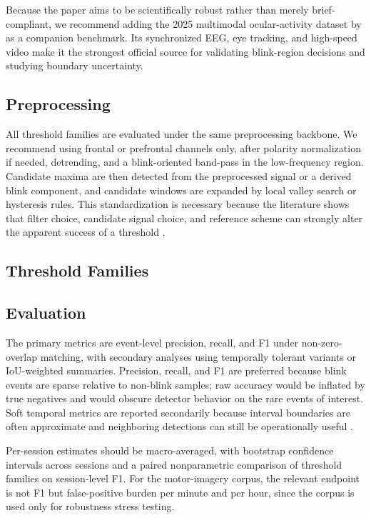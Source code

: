Because the paper aims to be scientifically robust rather than merely brief-compliant, we recommend adding the 2025 multimodal ocular-activity dataset by \citet{guttmann2025dataset} as a companion benchmark. Its synchronized EEG, eye tracking, and high-speed video make it the strongest official source for validating blink-region decisions and studying boundary uncertainty.

\subsection{Preprocessing}

All threshold families are evaluated under the same preprocessing backbone. We recommend using frontal or prefrontal channels only, after polarity normalization if needed, detrending, and a blink-oriented band-pass in the low-frequency region. Candidate maxima are then detected from the preprocessed signal or a derived blink component, and candidate windows are expanded by local valley search or hysteresis rules. This standardization is necessary because the literature shows that filter choice, candidate signal choice, and reference scheme can strongly alter the apparent success of a threshold \citep{chang2016detection,kleifges2017blinker,tran2021detection,zhang2023method}.

\subsection{Threshold Families}



\subsection{Evaluation}

The primary metrics are event-level precision, recall, and F1 under non-zero-overlap matching, with secondary analyses using temporally tolerant variants or IoU-weighted summaries. Precision, recall, and F1 are preferred because blink events are sparse relative to non-blink samples; raw accuracy would be inflated by true negatives and would obscure detector behavior on the rare events of interest. Soft temporal metrics are reported secondarily because interval boundaries are often approximate and neighboring detections can still be operationally useful \citep{saito2015precision,salles2024softed}.

Per-session estimates should be macro-averaged, with bootstrap confidence intervals across sessions and a paired nonparametric comparison of threshold families on session-level F1. For the motor-imagery corpus, the relevant endpoint is not F1 but false-positive burden per minute and per hour, since the corpus is used only for robustness stress testing.
